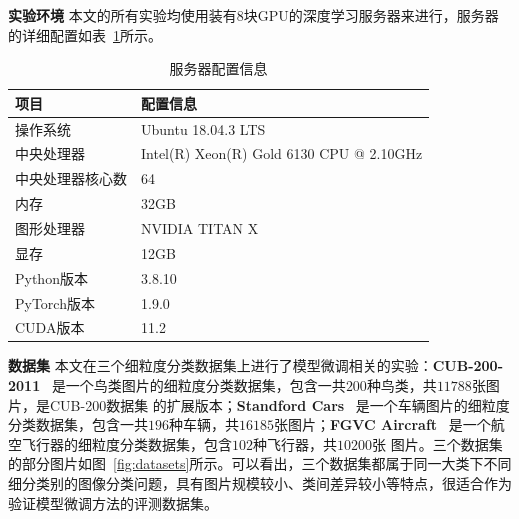 \textbf{实验环境 } 本文的所有实验均使用装有8块GPU的深度学习服务器来进行，服务器的详细配置如表~\ref{table:server-setting}所示。

\begin{table}[h]
	\begin{center}
	\caption{服务器配置信息}
	\label{table:server-setting}
    \begin{tabular}{ll}
        \toprule
        项目 & 配置信息 \\
        \midrule
        操作系统 & Ubuntu 18.04.3 LTS \\
        中央处理器 & Intel(R) Xeon(R) Gold 6130 CPU @ 2.10GHz \\
        中央处理器核心数 & 64 \\
        内存 & 32GB \\
        图形处理器 & NVIDIA TITAN X \\
        显存 & 12GB \\
        Python版本 & 3.8.10 \\
        PyTorch版本 & 1.9.0 \\
        CUDA版本 & 11.2 \\
        \bottomrule
    \end{tabular}
	\end{center}
\end{table}

\textbf{数据集 } 本文在三个细粒度分类数据集上进行了模型微调相关的实验：\textbf{CUB-200-2011 }~\citep{WelinderEtal2010}是一个鸟类图片的细粒度分类数据集，包含一共$200$种鸟类，共$11788$张图片，是CUB-200数据集
的扩展版本；\textbf{Standford Cars }~\citep{KrauseStarkDengFei-Fei_3DRR2013}是一个车辆图片的细粒度分类数据集，包含一共$196$种车辆，共$16185$张图片；\textbf{FGVC Aircraft }~\citep{maji2013fine}是一个航空飞行器的细粒度分类数据集，包含$102$种飞行器，共$10200$张
图片。三个数据集的部分图片如图~\ref{fig:datasets}所示。可以看出，三个数据集都属于同一大类下不同细分类别的图像分类问题，具有图片规模较小、类间差异较小等特点，很适合作为验证模型微调方法的评测数据集。

